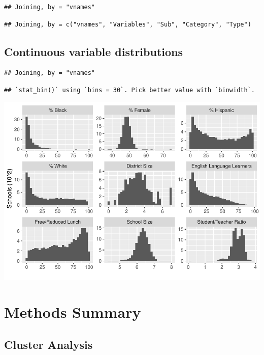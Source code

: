 \documentclass[
  english,
  man,floatsintext]{apa6}
\begin{document}
\begin{verbatim}
## Joining, by = "vnames"
\end{verbatim}

\begin{verbatim}
## Joining, by = c("vnames", "Variables", "Sub", "Category", "Type")
\end{verbatim}

\hypertarget{continuous-variable-distributions}{%
\subsection{Continuous variable distributions}\label{continuous-variable-distributions}}

\begin{verbatim}
## Joining, by = "vnames"
\end{verbatim}

\begin{verbatim}
## `stat_bin()` using `bins = 30`. Pick better value with `binwidth`.
\end{verbatim}

\includegraphics{5---Analysis_files/figure-latex/unnamed-chunk-2-1.pdf}

\hypertarget{methods-summary}{%
\section{Methods Summary}\label{methods-summary}}

\hypertarget{cluster-analysis}{%
\subsection{Cluster Analysis}\label{cluster-analysis}}
\end{document}
